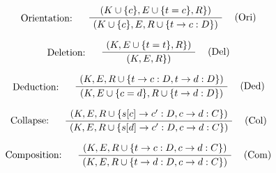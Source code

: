 \documentclass[twoside,a4paper]{article}
\theoremstyle{definition}
\begin{document}
\[
\AxiomC{$(K \cup \{c\},E \cup \{t = c \},R\})$}
\LeftLabel{Orientation: \quad}
\RightLabel{\quad (Ori)}
\UnaryInfC{$(K \cup \{c\},E,R \cup \{t \rightarrow c : D\})$}
\DisplayProof
\]

\[
\AxiomC{$(K,E \cup \{t = t \},R\})$}
\LeftLabel{Deletion: \quad}
\RightLabel{\quad (Del)}
\UnaryInfC{$(K,E,R\})$}
\DisplayProof
\]

\[
\AxiomC{$(K,E,R \cup \{t \rightarrow c : D , t \rightarrow d : D \})$}
\LeftLabel{Deduction: \quad}
\RightLabel{\quad (Ded)}
\UnaryInfC{$(K,E \cup \{c = d \},R \cup \{t \rightarrow d : D\})$}
\DisplayProof
\]

\[
\AxiomC{$(K,E,R \cup \{s[c] \rightarrow c' : D , c \rightarrow d : C \})$}
\LeftLabel{Collapse: \quad}
\RightLabel{\quad (Col)}
\UnaryInfC{$(K,E,R \cup \{s[d] \rightarrow c' : D , c \rightarrow d : C \})$}
\DisplayProof
\]

\[
\AxiomC{$(K,E,R \cup \{t \rightarrow c : D , c \rightarrow d : C \})$}
\LeftLabel{Composition: \quad}
\RightLabel{\quad (Com)}
\UnaryInfC{$(K,E,R \cup \{t \rightarrow d : D , c \rightarrow d : C \})$}
\DisplayProof
\]



\end{document}

